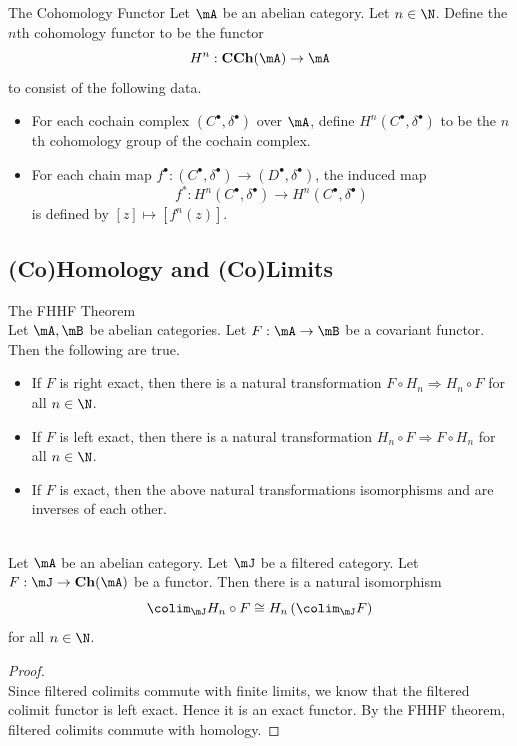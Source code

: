 \documentclass[a4paper]{article}
\begin{document}
\begin{defn}{The Cohomology Functor}{} Let $\mA$ be an abelian category. Let $n\in\N$. Define the $n$th cohomology functor to be the functor $$H^n:\bold{CCh}(\mA)\to\mA$$ to consist of the following data. 
\begin{itemize}
\item For each cochain complex $(C^\bullet,\delta^\bullet)$ over $\mA$, define $H^n(C^\bullet,\delta^\bullet)$ to be the $n$th cohomology group of the cochain complex. 
\item For each chain map $f^\bullet:(C^\bullet,\delta^\bullet)\to(D^\bullet,\delta^\bullet)$, the induced map $$f^\ast:H^n(C^\bullet,\delta^\bullet)\to H^n(C^\bullet,\delta^\bullet)$$ is defined by $[z]\mapsto[f^n(z)]$. 
\end{itemize}
\end{defn}

\subsection{(Co)Homology and (Co)Limits}
\begin{thm}{The FHHF Theorem}{}\\
Let $\mA,\mB$ be abelian categories. Let $F:\mA\to\mB$ be a covariant functor. Then the following are true. 
\begin{itemize}
\item If $F$ is right exact, then there is a natural transformation $F\circ H_n\Rightarrow H_n\circ F$ for all $n\in\N$. 
\item If $F$ is left exact, then there is a natural transformation $H_n\circ F\Rightarrow F\circ H_n$ for all $n\in\N$. 
\item If $F$ is exact, then the above natural transformations isomorphisms and are inverses of each other. 
\end{itemize}
\end{thm}

\begin{prp}{}{}\\
Let $\mA$ be an abelian category. Let $\mJ$ be a filtered category. Let $F:\mJ\to\bold{Ch}(\mA)$ be a functor. Then there is a natural isomorphism $$\colim_\mJ H_n\circ F\cong H_n\left(\colim_\mJ F\right)$$ for all $n\in\N$. 
\begin{proof}\\
Since filtered colimits commute with finite limits, we know that the filtered colimit functor is left exact. Hence it is an exact functor. By the FHHF theorem, filtered colimits commute with homology. 
\end{proof}
\end{prp}
\end{document}
